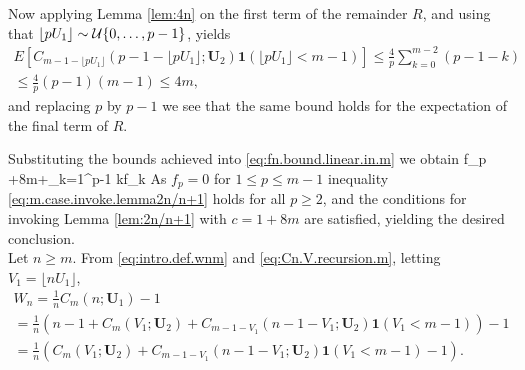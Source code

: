\documentclass[12pt]{article}
\begin{document}
Now applying Lemma \ref{lem:4n} on the first term of the remainder $R$, and using that $\lfloor pU_1 \rfloor \sim {\cal U}\{0,\ldots,p-1\}$, yields
\begin{multline*}
E[C_{m-1-\lfloor pU_1 \rfloor}(p-1-\lfloor pU_1 \rfloor; \textbf{U}_2)\textbf{1}(\lfloor pU_1 \rfloor < m-1)] \le \frac{4}{p}\sum_{k=0}^{m-2}(p-1-k) \\
\le  \frac{4}{p}(p-1)(m-1) \le 4m,
\end{multline*}
and replacing $p$ by $p-1$ we see that the same bound holds for the expectation of the final term of $R$. 

Substituting the bounds achieved into \eqref{eq:fn.bound.linear.in.m} we obtain
\bea \label{eq:m.case.invoke.lemma2n/n+1}
f_p +8m+\sum_{k=1}^{p-1} kf_k 
\ena
As $f_p=0$ for $1 \le p \le m-1$ inequality \eqref{eq:m.case.invoke.lemma2n/n+1} holds for all $p \ge 2$, and the conditions for invoking Lemma \ref{lem:2n/n+1} with
$c=1+8m$ are satisfied, yielding the desired conclusion. \bbox \\[1ex]



Let $n \ge m$. From \eqref{eq:intro.def.wnm} and \eqref{eq:Cn.V.recursion.m}, letting $V_1=\lfloor nU_1 \rfloor$, 
\begin{multline} \label{Dn:one.level.down.m}
W_n=\frac{1}{n}C_m(n;\textbf{U}_1)-1 \\= \frac{1}{n}(n-1+C_m(V_1;\textbf{U}_2)+C_{m-1-V_1}(n-1-V_1;\textbf{U}_2)\textbf{1}(V_1 < m-1))-1\\
= \frac{1}{n}(C_m(V_1;\textbf{U}_2)+C_{m-1-V_1}(n-1-V_1;\textbf{U}_2)\textbf{1}(V_1 < m-1)-1).
\end{multline}
\end{document}
